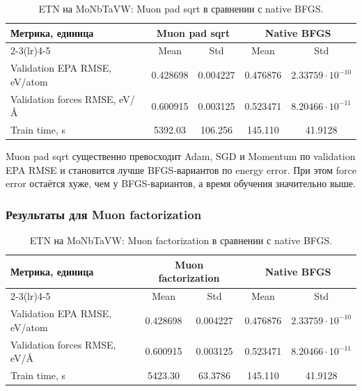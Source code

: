 \begin{table}[H]
\centering
\small
\caption{ETN на MoNbTaVW: Muon pad sqrt в сравнении с native BFGS.}
\label{tab:etn-monbtavw-muon-pad}
\begin{tabular}{lcccc}
\toprule
\multirow{2}{*}{Метрика, единица} & \multicolumn{2}{c}{Muon pad sqrt} & \multicolumn{2}{c}{Native BFGS} \\
\cmidrule(lr){2-3}\cmidrule(lr){4-5}
 & Mean & Std & Mean & Std \\
\midrule
Validation EPA RMSE, eV/atom & 0.428698 & 0.004227 & 0.476876 & \(2.33759\cdot 10^{-10}\) \\
Validation forces RMSE, eV/\AA & 0.600915 & 0.003125 & 0.523471 & \(8.20466\cdot 10^{-11}\) \\
Train time, s & 5392.03 & 106.256 & 145.110 & 41.9128 \\
\bottomrule
\end{tabular}
\end{table}


Muon pad sqrt существенно превосходит Adam, SGD и Momentum по validation EPA RMSE и становится лучше BFGS-вариантов по energy error. При этом force error остаётся хуже, чем у BFGS-вариантов, а время обучения значительно выше.

\FloatBarrier

\subsubsection{Результаты для Muon factorization}

\begin{table}[H]
\centering
\small
\caption{ETN на MoNbTaVW: Muon factorization в сравнении с native BFGS.}
\label{tab:etn-monbtavw-muon-factor}
\begin{tabular}{lcccc}
\toprule
\multirow{2}{*}{Метрика, единица} & \multicolumn{2}{c}{Muon factorization} & \multicolumn{2}{c}{Native BFGS} \\
\cmidrule(lr){2-3}\cmidrule(lr){4-5}
 & Mean & Std & Mean & Std \\
\midrule
Validation EPA RMSE, eV/atom & 0.428698 & 0.004227 & 0.476876 & \(2.33759\cdot 10^{-10}\) \\
Validation forces RMSE, eV/\AA & 0.600915 & 0.003125 & 0.523471 & \(8.20466\cdot 10^{-11}\) \\
Train time, s & 5423.30 & 63.3786 & 145.110 & 41.9128 \\
\bottomrule
\end{tabular}
\end{table}

